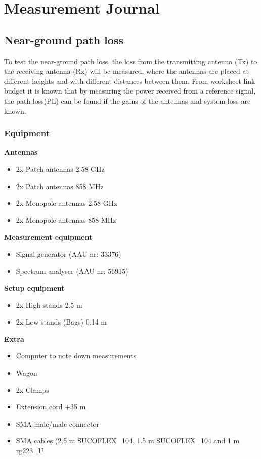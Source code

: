 \chapter{Measurement Journal}

\section*{Near-ground path loss }
To test the near-ground path loss, the loss from the transmitting antenna (Tx) to the receiving antenna (Rx) will be measured, where the antennas are placed at different heights and with different distances between them. From worksheet link budget it is known that by measuring the power received from a reference signal, the path loss(PL) can be found if the gains of the antennas and system loss are known.

\subsection*{Equipment}
\textbf{Antennas}
\begin{itemize}
\item 2x Patch antennas 2.58 GHz
\item 2x Patch antennas 858 MHz
\item 2x Monopole antennas 2.58 GHz
\item 2x Monopole antennas 858 MHz
\end{itemize}

\textbf{Measurement equipment}
\begin{itemize}
\item Signal generator (AAU nr: 33376)
\item Spectrum analyser (AAU nr: 56915)
\end{itemize}

\textbf{Setup equipment}
\begin{itemize}
\item 2x High stands 2.5 m
\item 2x Low stands (Bags) 0.14 m
\end{itemize}

\textbf{Extra}
\begin{itemize}
\item Computer to note down measurements
\item Wagon
\item 2x Clamps
\item Extension cord +35 m
\item SMA male/male connector
\item SMA cables (2.5 m SUCOFLEX\_104, 1.5 m SUCOFLEX\_104 and 1 m rg223\_U 
\end{itemize}

